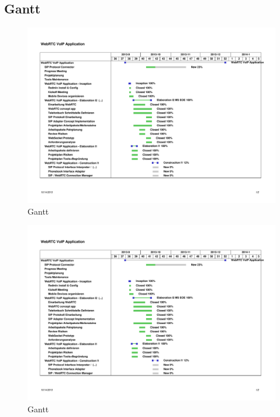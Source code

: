	\begin{landscape}
	\subsection{Gantt}
		\begin{figure}[H]
			\centering
			\includegraphics[trim=1.5cm 2.5cm 1cm 3cm, clip=true,page=1,width=1.4\textwidth]{media/jsvoipcommunication-gantt.pdf}
			\caption[Gantt]{Gantt}
			\label{gantt}
		\end{figure}
		\begin{figure}[H]
			\centering
			\includegraphics[trim=1.5cm 2.5cm 1cm 1cm, clip=true,page=2,width=1.4\textwidth]{media/jsvoipcommunication-gantt.pdf}
			\caption[Gantt]{Gantt}
			\label{gantt}
		\end{figure}
	\end{landscape}
